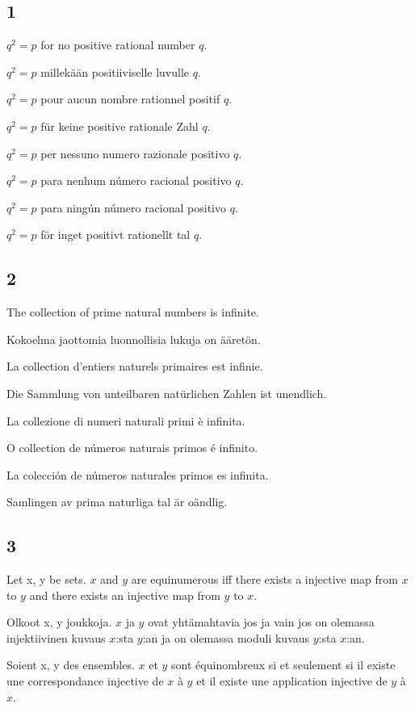 \documentclass{article}
\begin{document}
\subsection*{1}

$ q^{2} = p $ for no positive rational number $ q $.

$ q^{2} = p $ millekään positiiviselle luvulle $ q $.

$ q^{2} = p $ pour aucun nombre rationnel positif $ q $.

$ q^{2} = p $ für keine positive rationale Zahl $ q $.

$ q^{2} = p $ per nessuno numero razionale positivo $ q $.

$ q^{2} = p $ para nenhum número racional positivo $ q $.

$ q^{2} = p $ para ningún número racional positivo $ q $.

$ q^{2} = p $ för inget positivt rationellt tal $ q $.

\subsection*{2}

The collection of prime natural numbers is infinite.

Kokoelma jaottomia luonnollisia lukuja on ääretön.

La collection d'entiers naturels primaires est infinie.

Die Sammlung von unteilbaren natürlichen Zahlen ist unendlich.

La collezione di numeri naturali primi è infinita.

O collection de números naturais primos é infinito.

La colección de números naturales primos es infinita.

Samlingen av prima naturliga tal är oändlig.

\subsection*{3}

Let x, y be sets. $ x $ and $ y $ are equinumerous iff there exists a injective map from $ x $ to $ y $ and there exists an injective map from $ y $ to $ x $.

Olkoot x, y joukkoja. $ x $ ja $ y $ ovat yhtämahtavia jos ja vain jos on olemassa injektiivinen kuvaus $ x $:sta $ y $:an ja on olemassa moduli kuvaus $ y $:sta $ x $:an.

Soient x, y des ensembles. $ x $ et $ y $ sont équinombreux si et seulement si il existe une correspondance injective de $ x $ à $ y $ et il existe une application injective de $ y $ à $ x $.
\end{document}
